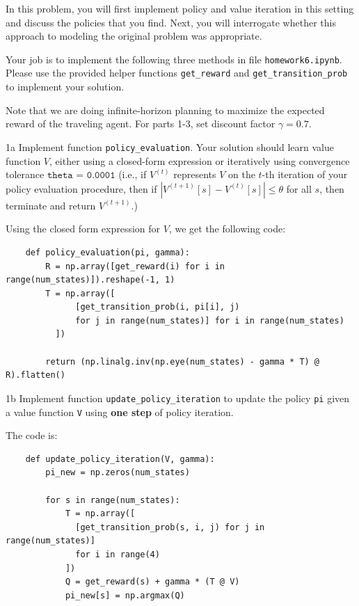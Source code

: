 \documentclass[expanded]{lkx_pset}
\begin{document}
\begin{solution}
	In this problem, you will first implement policy and value iteration in this setting and discuss the policies that you find.  Next, you will interrogate whether this approach to modeling the original problem was appropriate.

	Your job is to implement the following three methods in file \texttt{homework6.ipynb}. Please use the provided helper functions \texttt{get\_reward} and \texttt{get\_transition\_prob} to implement your solution.

	Note that we are doing infinite-horizon planning to maximize the expected reward of the traveling agent. For parts 1-3, set discount factor $\gamma = 0.7$.

	\newpage
	\begin{part}{1a}
		Implement function \texttt{policy\_evaluation}.  Your
		solution should learn value function $V$, either using a closed-form expression or iteratively using
		convergence tolerance $\texttt{theta = 0.0001}$ (i.e., if
		$V^{(t)}$ represents $V$ on the $t$-th iteration of your policy
		evaluation procedure, then if $|V^{(t + 1)}[s] - V^{(t)}[s]|
			\leq \theta$ for all $s$, then terminate and return $V^{(t + 1)}$.)
	\end{part}

	Using the closed form expression for $V$, we get the following code:
	\begin{verbatim}
	def policy_evaluation(pi, gamma):
    	R = np.array([get_reward(i) for i in range(num_states)]).reshape(-1, 1)
    	T = np.array([
    		  [get_transition_prob(i, pi[i], j) 
    		  for j in range(num_states)] for i in range(num_states)
    	  ])

    	return (np.linalg.inv(np.eye(num_states) - gamma * T) @ R).flatten()
  \end{verbatim}

	\begin{part}{1b}
		Implement function \texttt{update\_policy\_iteration} to update the policy \texttt{pi} given a value function \texttt{V} using \textbf{one step} of policy iteration.
	\end{part}

	The code is:
	\begin{verbatim}
	def update_policy_iteration(V, gamma):
    	pi_new = np.zeros(num_states)

    	for s in range(num_states):
        	T = np.array([
        	  [get_transition_prob(s, i, j) for j in range(num_states)] 
        	  for i in range(4)
        	])
        	Q = get_reward(s) + gamma * (T @ V)
        	pi_new[s] = np.argmax(Q)


\end{verbatim}
\end{solution}
\end{document}
